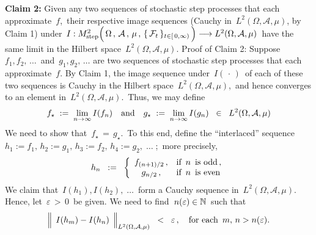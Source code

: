\begin{enumerate}
	\vskip 0.5cm
	\textbf{Claim 2:}\quad
	Given any two sequences of stochastic step processes that each approximate \,$f$,\,
	their respective image sequences (Cauchy in \,$L^{2}(\Omega,\mathcal{A},\mu)$, by Claim 1) under
	\,$I : M^{2}_{\textnormal{step}}\!
	\left(\,
		\overset{{\color{white}.}}{\Omega} \,,\, \mathcal{A} \,,\, \mu \,,\, \{\,\mathcal{F}_{t}\,\}_{t \in [\,0,\infty)}
		\,\right)\longrightarrow L^{2}(\Omega,\mathcal{A},\mu)$\,
	have the same limit in the Hilbert space \,$L^{2}(\Omega,\mathcal{A},\mu)$.
	\vskip 0.2cm
	\noindent
	Proof of Claim 2:\quad
	Suppose
	\,$f_{1}, f_{2}, \,\ldots$\, and \,$g_{1}, g_{2}, \,\ldots$\; are two sequences of stochastic step processes
	that each approximate \,$f$.
	By Claim 1, the image sequence under \,$I(\,\cdot\,)$\, of each of these two sequences
	is Cauchy in the Hilbert space \,$L^{2}(\Omega,\mathcal{A},\mu)$,\,
	and hence converges to an element in \,$L^{2}(\Omega,\mathcal{A},\mu)$.\,
	Thus, we may define
	\begin{equation*}
	f_{\star} \; := \; \underset{n\rightarrow\infty}{\lim}\,I(f_{n})
	\quad\textnormal{and}\quad
	g_{\star} \; := \; \underset{n\rightarrow\infty}{\lim}\,I(g_{n})
	\;\; \in \;\; L^{2}(\Omega,\mathcal{A},\mu)
	\end{equation*}
	We need to show that \,$f_{\star} \, = \, g_{\star}$.\,
	To this end, define the ``interlaced'' sequence
	\,$h_{1} := f_{1},\, h_{2} := g_{1},\, h_{3} := f_{2},\, h_{4} := g_{2},\;\ldots\;$;\,
	more precisely,
	\begin{equation*}
	h_{n} \;\; := \;\;
		\left\{\begin{array}{cl}
		f_{(n+1)/2}\,, & \textnormal{if \,$n$\, is odd}\,,
		\\
		g_{n/2}\,, & \textnormal{if \,$n$\, is even}
		\end{array}\right.
	\end{equation*}
	We claim that \,$I(h_{1}), I(h_{2}), \;\ldots$\, form a Cauchy sequence in \,$L^{2}(\Omega,\mathcal{A},\mu)$.\,
	Hence, let \,$\varepsilon \, > \, 0$\, be given. We need to find \,$n(\varepsilon) \in \mathbb{N}$\, such that
	\begin{equation*}
	\left\Vert\;\, I(h_{m}) \overset{{\color{white}.}}{-} I(h_{n}) \,\;\right\Vert_{L^{2}(\Omega,\mathcal{A},\mu)}
	\;\; < \;\; \varepsilon\,,
	\quad\textnormal{for each \,$m,\, n > n(\varepsilon)$}.
	\end{equation*}

\end{enumerate}
